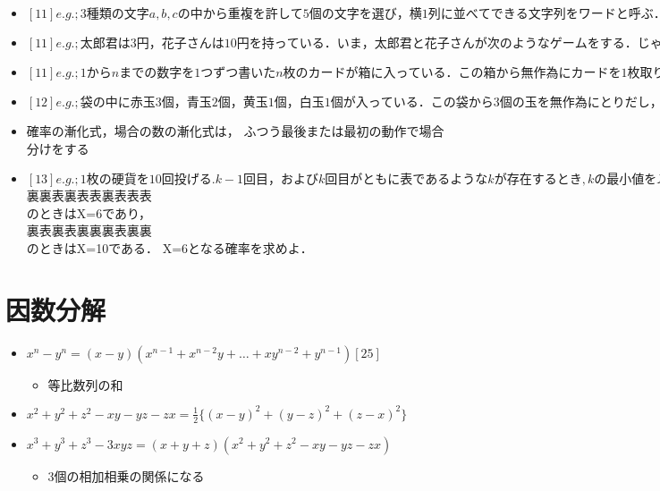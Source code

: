 \documentclass[dvipdfmx,uplatex]{jsarticle}
\begin{document}
\begin{itemize}
	\item $ [11]e.g.;3種類の文字a, b, cの中から重複を許して5個の文字を選び，
	横1列に並べてできる文字列をワードと呼ぶ．文字列bcを含まない
	ワードの総数， すなわち6の直後にcがこないようなワードの総数
	を求めよ． $
	\item $ [11]e.g.;太郎君は3円，花子さんは10円を持っている． いま，太郎君と
	花子さんが次のようなゲームをする．
	じゃんけんをし，太郎君が勝ったならば花子さんから1円をもら
	え，太郎君が負けたならば花子さんに1円を支払う． （ただし，太郎
	くんがじゃんけんに勝つ確率は1/2とし｡,あいこはないものとする. ）
	太郎君の所持金がちょうど0円となるか， あるいは5円となった
	ときにこのゲームを終わることにする． 6回目のじゃんけんで太郎君
	の所持金が3円になる確率を求めよ．$
	\item $ [11]e.g.;1からnまでの数字を1つずつ書いたn枚のカードが箱に入っ
	ている． この箱から無作為にカードを1枚取り出して数字を記録し，
	箱に戻すという操作を繰り返す． ただし, k回目の操作で直前のカー
	ドと同じ数字か直前のカードよりも小さい数字のカードを取り出し
	た場合に， たを得点として終了する． 2 \leq k \leq n+1を満たす自然数
	kについて，得点がkとなる確率を求めよ．$
	\item $ [12]e.g.;袋の中に赤玉3個，青玉2個，黄玉1個， 白玉1個が入ってい
	る． この袋から3個の玉を無作為にとりだし，赤，青，黄色の箱に1
	個ずつ無作為にいれる． このとき， すくなくとも1つの箱について
	箱と箱の中の玉の色が一致する確率を求めよ．$
	\item 確率の漸化式，場合の数の漸化式は， ふつう最後または最初の動作で場合分けをする
	\item $ [13]e.g.;1枚の硬貨を10回投げる. k-1回目， およびk回目がともに
	表であるようなkが存在するとき, kの最小値をXとする． このよ
	うなkが存在しないときはX=10とする．例えば，投げた結果が$ \\
	裏裏表裏表表裏表表表 \\
	のときはX=6であり，\\
	裏表裏表裏裏裏表裏裏 \\
	のときはX=10である． X=6となる確率を求めよ．

\end{itemize}

\section{因数分解}
\begin{itemize}
	\item $ x^n - y^n = (x - y)(x^{n - 1} + x^{n - 2}y + … + xy^{n - 2} + y^{n - 1}) [25]$
	\begin{itemize}
		\item $ 等比数列の和$
	\end{itemize}
	\item $x^2+y^2+z^2-xy-yz-zx=\frac{1}{2}\{(x-y)^2+(y-z)^2+(z-x)^2\}$
	\item $x^3+y^3+z^3-3xyz=(x+y+z)(x^2+y^2+z^2-xy-yz-zx)$

	\begin{itemize}
		\item 3個の相加相乗の関係になる
	\end{itemize}
\end{itemize}
\end{document}
